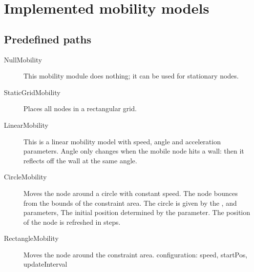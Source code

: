 
\section{Implemented mobility models}

\subsection{Predefined paths}

\begin{description}

\item[NullMobility] This mobility module does nothing;
it can be used for stationary nodes.

\item[StaticGridMobility] Places all nodes in a rectangular grid.


\item[LinearMobility] This is a linear mobility model with speed,
angle and acceleration parameters. Angle only changes when the mobile
node hits a wall: then it reflects off the wall at the same angle.


\item[CircleMobility] Moves the node around a circle with constant speed.
The node bounces from the bounds of the constraint area.
The circle is given by the ,  and  parameters,
The initial position determined by the  parameter.
The position of the node is refreshed in  steps.


\item[RectangleMobility] Moves the node around the constraint area.
configuration: speed, startPos, updateInterval

\end{description}

